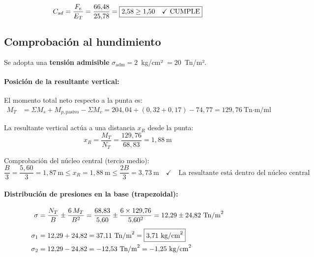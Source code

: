 \begin{equation}
  C_{sd} = \frac{F_e}{E_T} = \frac{66{,}48}{25{,}78} = \boxed{2{,}58 \geq 1{,}50 \quad \checkmark~\text{CUMPLE}}
  \label{eq:fs_desliz}
\end{equation}

\subsection{Comprobación al hundimiento}
\label{subsec:hundimiento}

Se adopta una \textbf{tensión admisible} $\sigma_\text{adm} = 2$~kg/cm²
$= 20$~Tn/m².

\paragraph{Posición de la resultante vertical:}

El momento total neto respecto a la punta es:
\begin{align*}
  M_T &= \Sigma M_s + M_{p,\text{pasivo}} - \Sigma M_v
        = 204{,}04 + (0{,}32 + 0{,}17) - 74{,}77 = 129{,}76~\text{Tn·m/ml}
\end{align*}

La resultante vertical actúa a una distancia $x_R$ desde la punta:
\[
  x_R = \frac{M_T}{N_T} = \frac{129{,}76}{68{,}83} = 1{,}88~\text{m}
\]

Comprobación del núcleo central (tercio medio):
\[
  \frac{B}{3} = \frac{5{,}60}{3} = 1{,}87~\text{m} \leq x_R = 1{,}88~\text{m}
  \leq \frac{2B}{3} = 3{,}73~\text{m} \quad \checkmark \quad
  \text{La resultante está dentro del núcleo central}
\]

\paragraph{Distribución de presiones en la base (trapezoidal):}

\begin{align*}
  \sigma &= \frac{N_T}{B} \pm \frac{6\,M_T}{B^2}
           = \frac{68{,}83}{5{,}60} \pm \frac{6 \times 129{,}76}{5{,}60^2}
           = 12{,}29 \pm 24{,}82~\text{Tn/m}^2 \\[4pt]
  \sigma_1 &= 12{,}29 + 24{,}82 = 37{,}11~\text{Tn/m}^2 = \boxed{3{,}71~\text{kg/cm}^2} \\
  \sigma_2 &= 12{,}29 - 24{,}82 = -12{,}53~\text{Tn/m}^2 = -1{,}25~\text{kg/cm}^2
\end{align*}

